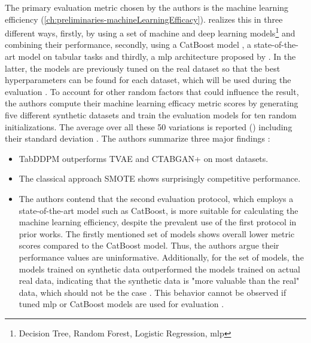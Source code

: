The primary evaluation metric chosen by the authors is the machine learning efficiency (\autoref{ch:preliminaries-machineLearningEfficacy}).
\cite{kotelnikov2022TabDDPMModellingTabular} realizes this in three different ways, firstly, by using a set of machine and deep learning models\footnote[1]{Decision Tree, Random Forest, Logistic Regression, \gls{mlp}} and combining their performance,
secondly, using a CatBoost model \cite{prokhorenkova2018CatBoostUnbiasedBoosting}, a state-of-the-art model on tabular tasks \cite{kotelnikov2022TabDDPMModellingTabular} and thirdly, a \gls{mlp} architecture proposed by \cite{gorishniy2021RevisitingDeepLearning}.
In the latter, the models are previously tuned on the real dataset so that the best hyperparameters can be found for each dataset, which will be used during the evaluation \cite{kotelnikov2022TabDDPMModellingTabular}.
To account for other random factors that could influence the result, the authors compute their machine learning efficacy metric scores by generating five different synthetic datasets and train the evaluation models for ten random initializations.
The average over all these 50 variations is reported (\cite[Table 3, 4, p. 8]{kotelnikov2022TabDDPMModellingTabular}) including their standard deviation \cite{kotelnikov2022TabDDPMModellingTabular}.
The authors summarize three major findings \cite{kotelnikov2022TabDDPMModellingTabular}:
\begin{itemize}
    \item TabDDPM outperforms TVAE and CTABGAN+ on most datasets.
    \item The classical approach SMOTE shows surprisingly competitive performance.
    \item The authors contend that the second evaluation protocol, which employs a state-of-the-art model such as CatBoost, is more suitable for calculating the machine learning efficiency, 
    despite the prevalent use of the first protocol in prior works. 
    The firstly mentioned set of models shows overall lower metric scores compared to the CatBoost model.
    Thus, the authors argue their performance values are uninformative.
    Additionally, for the set of models, the models trained on synthetic data outperformed the models trained on actual real data, indicating that the 
    synthetic data is "more valuable than the real" data, which should not be the case \cite[p. 8]{kotelnikov2022TabDDPMModellingTabular}.
    This behavior cannot be observed if tuned \gls{mlp} or CatBoost models are used for evaluation \cite{kotelnikov2022TabDDPMModellingTabular}.
\end{itemize}

